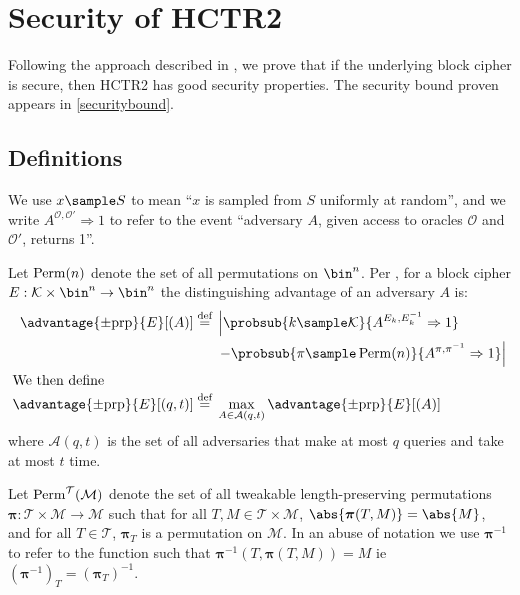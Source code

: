 \documentclass[hctr2.tex]{subfiles}
\begin{document}
\section{Security of HCTR2}\label{security}
Following the approach described in \cite{concrete},
we prove that if the underlying block cipher is secure,
then HCTR2 has good security properties.
The security bound proven appears in \autoref{securitybound}.
\subsection{Definitions}\label{definitions}
We use \(x \sample S\) to mean ``\(x\) is sampled from \(S\)
uniformly at random'', and we write
\(A^{\mathcal{O}, \mathcal{O}'}\Rightarrow 1\) to refer
to the event ``adversary \(A\),
given access to oracles \(\mathcal{O}\) and \(\mathcal{O}'\),
returns 1''.

Let $\operatorname{Perm}(n)$ denote the set of all permutations on \(\bin^n\).
Per \cite{concrete}, for a block cipher 
\(E: \mathcal{K} \times \bin^n \rightarrow \bin^n\)
the distinguishing advantage of an adversary \(A\) is:
%
\begin{align*}
    \advantage{\pm \mathrm{prp}}{E}[(A)] \defeq
    {}&\left\lvert\probsub{k \sample \mathcal{K}}{A^{E_k,E_k^{-1}}\Rightarrow 1}\right.
    \\
    {}&\left. - \probsub{\pi \sample \Perm(n)}{A^{\pi,\pi^{-1}}\Rightarrow 1}\right\rvert
    \\
    \intertext{We then define}
    \advantage{\pm \mathrm{prp}}{E}[(q, t)] \defeq
    {}&\max_{A \in \mathcal{A}(q, t)} \advantage{\pm \mathrm{prp}}{E}[(A)]
\end{align*}
where $\mathcal{A}(q, t)$
is the set of all adversaries that make at most $q$ queries and take at most $t$ time.

Let $\operatorname{Perm}^\mathcal{T}(\mathcal{M})$
denote the set of all
tweakable length-preserving permutations
$\bm{\pi} : \mathcal{T} \times \mathcal{M} \rightarrow \mathcal{M}$
such that for all $T, M \in \mathcal{T} \times \mathcal{M}$,
$\abs{\bm{\pi}(T, M)} = \abs{M}$, and
for all $T \in \mathcal{T}$, $\bm{\pi}_{T}$ is a permutation on \(\mathcal{M}\).
In an abuse of notation
we use $\bm{\pi}^{-1}$ to refer to the function
such that $\bm{\pi}^{-1}(T, \bm{\pi}(T, M)) = M$ ie $(\bm{\pi}^{-1})_T = (\bm{\pi}_T)^{-1}$.
\end{document}

